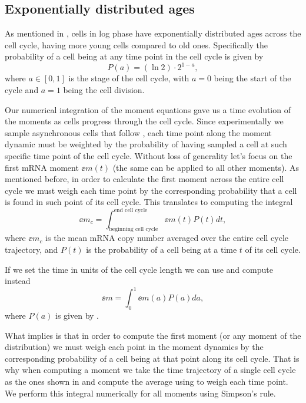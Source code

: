 \subsection{Exponentially distributed ages}

As mentioned in , cells in log phase have
exponentially distributed ages across the cell cycle, having more young cells
compared to old ones. Specifically the probability of a cell being at any time
point in the cell cycle is given by \cite{Powell1956}
\begin{equation}
  P(a) = (\ln 2) \cdot 2^{1 - a},
  \label{seq_age_prob}
\end{equation}
where $a \in [0, 1]$ is the stage of the cell cycle, with $a = 0$ being the
start of the cycle and $a = 1$ being the cell division.

Our numerical integration of the moment equations gave us a time evolution of
the moments as cells progress through the cell cycle. Since experimentally we
sample asynchronous cells that follow , each time point along
the moment dynamic must be weighted by the probability of having sampled a cell
at such specific time point of the cell cycle. Without loss of generality let's
focus on the first mRNA moment $\ee{m(t)}$ (the same can be applied to all other
moments). As mentioned before, in order to calculate the first moment across the
entire cell cycle we must weigh each time point by the corresponding probability
that a cell is found in such point of its cell cycle. This translates to
computing the integral
\begin{equation}
  \ee{m}_c = \int_{\text{beginning cell cycle}}^{\text{end cell cycle}}
                       \ee{m(t)} P(t) dt,
\end{equation}
where $\ee{m}_c$ is the mean mRNA copy number averaged over the entire cell
cycle trajectory, and $P(t)$ is the probability of a cell being at a time $t$ of
its cell cycle.

If we set the time in units of the cell cycle length we can use
 and compute instead
\begin{equation}
  \ee{m} = \int_0^1 \ee{m(a)} P(a) da,
  \label{seq_moment_avg}
\end{equation}
where $P(a)$ is given by .

What  implies is that in order to compute the first moment
(or any moment of the distribution) we must weigh each point in the moment
dynamics by the corresponding probability of a cell being at that point along
its cell cycle. That is why when computing a moment we take the time trajectory
of a single cell cycle as the ones shown in  and
compute the average using  to weigh each time point. We
perform this integral numerically for all moments using Simpson's rule.


